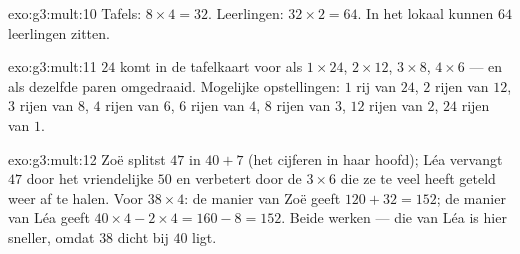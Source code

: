 \begin{solution}{exo:g3:mult:10}
Tafels: $8 \times 4 = 32$. Leerlingen: $32 \times 2 = 64$. In het lokaal
kunnen $64$ leerlingen zitten.
\end{solution}

\begin{solution}{exo:g3:mult:11}
$24$ komt in de tafelkaart voor als $1 \times 24$, $2 \times 12$,
$3 \times 8$, $4 \times 6$ --- en als dezelfde paren omgedraaid.
Mogelijke opstellingen: $1$ rij van $24$, $2$ rijen van $12$, $3$ rijen
van $8$, $4$ rijen van $6$, $6$ rijen van $4$, $8$ rijen van $3$, $12$
rijen van $2$, $24$ rijen van $1$.
\end{solution}

\begin{solution}{exo:g3:mult:12}
Zoë splitst $47$ in $40 + 7$ (het cijferen in haar hoofd); Léa vervangt
$47$ door het vriendelijke $50$ en verbetert door de $3 \times 6$ die ze
te veel heeft geteld weer af te halen. Voor $38 \times 4$: de manier van
Zoë geeft $120 + 32 = 152$; de manier van Léa geeft
$40 \times 4 - 2 \times 4 = 160 - 8 = 152$. Beide werken --- die van Léa
is hier sneller, omdat $38$ dicht bij $40$ ligt.
\end{solution}
